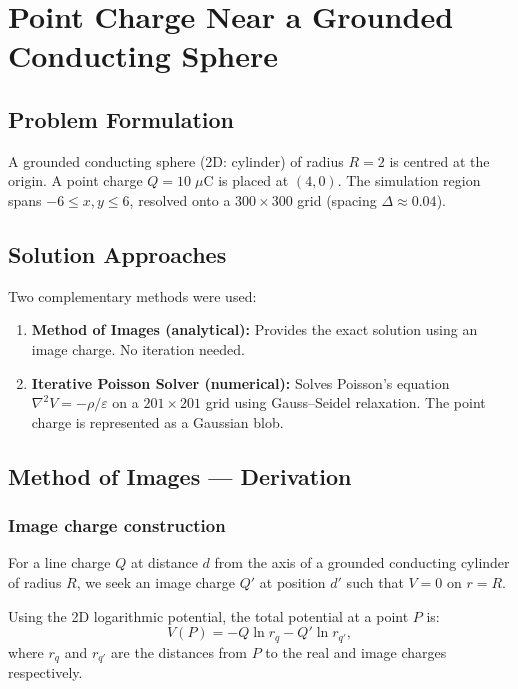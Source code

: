 \documentclass[11pt,a4paper]{article}
\begin{document}
\newpage

\section{Point Charge Near a Grounded Conducting Sphere}

\subsection{Problem Formulation}

A grounded conducting sphere (2D: cylinder) of radius $R=2$ is centred at the origin. A point charge $Q=10\;\mu$C is placed at $(4,0)$. The simulation region spans $-6 \le x,y \le 6$, resolved onto a $300 \times 300$ grid (spacing $\Delta \approx 0.04$).

\subsection{Solution Approaches}

Two complementary methods were used:
\begin{enumerate}[leftmargin=2em]
\item \textbf{Method of Images (analytical):} Provides the exact solution using an image charge. No iteration needed.
\item \textbf{Iterative Poisson Solver (numerical):} Solves Poisson's equation $\nabla^2 V = -\rho/\varepsilon$ on a $201\times201$ grid using Gauss--Seidel relaxation. The point charge is represented as a Gaussian blob.
\end{enumerate}

\subsection{Method of Images --- Derivation}

\subsubsection{Image charge construction}

For a line charge $Q$ at distance $d$ from the axis of a grounded conducting cylinder of radius $R$, we seek an image charge $Q'$ at position $d'$ such that $V=0$ on $r=R$.

Using the 2D logarithmic potential, the total potential at a point $P$ is:
\begin{equation}
V(P) = -Q \ln r_q - Q' \ln r_{q'},
\end{equation}
where $r_q$ and $r_{q'}$ are the distances from $P$ to the real and image charges respectively.
\end{document}
